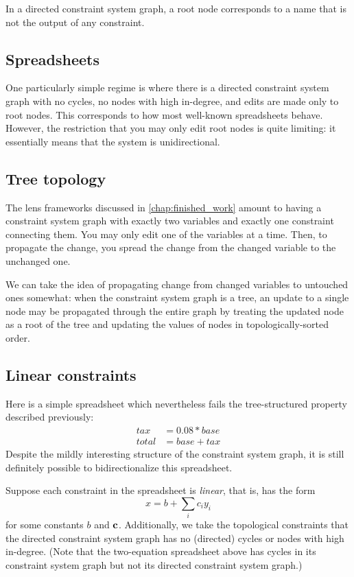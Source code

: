In a directed constraint system graph, a root node corresponds to a name
that is not the output of any constraint.

\subsection{Spreadsheets}
One particularly simple regime is where there is a directed constraint
system graph with no cycles, no nodes with high in-degree, and edits are
made only to root nodes. This corresponds to how most well-known
spreadsheets behave. However, the restriction that you may only edit root
nodes is quite limiting: it essentially means that the system is
unidirectional.

\subsection{Tree topology}
The lens frameworks discussed in \ref{chap:finished_work} amount to having a
constraint system graph with exactly two variables and exactly one
constraint connecting them. You may only edit one of the variables at a
time. Then, to propagate the change, you spread the change from the changed
variable to the unchanged one.

We can take the idea of propagating change from changed variables to
untouched ones somewhat: when the constraint system graph is a tree, an
update to a single node may be propagated through the entire graph by
treating the updated node as a root of the tree and updating the values of
nodes in topologically-sorted order.

\subsection{Linear constraints}
Here is a simple spreadsheet which nevertheless fails the tree-structured
property described previously:
\begin{align*}
    tax &= 0.08*base \\
    total &= base + tax
\end{align*}
Despite the mildly interesting structure of the constraint system graph, it
is still definitely possible to bidirectionalize this spreadsheet.

Suppose each constraint in the spreadsheet is \emph{linear}, that is, has
the form
\[x = b+\sum_ic_iy_i\]
for some constants $b$ and $\bf c$. Additionally, we take the topological
constraints that the directed constraint system graph has no (directed)
cycles or nodes with high in-degree. (Note that the two-equation spreadsheet
above has cycles in its constraint system graph but not its directed
constraint system graph.)

